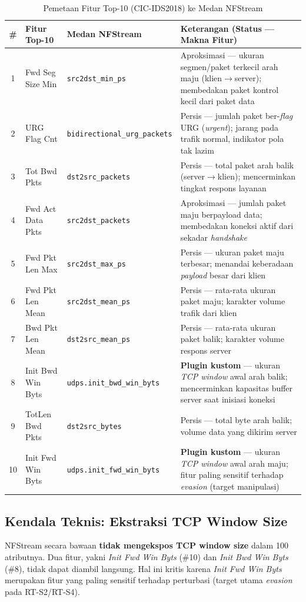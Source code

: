 \documentclass[11pt, a4paper]{article}
\begin{document}
\begin{table}[htbp]
\centering
\caption{Pemetaan Fitur Top-10 (CIC-IDS2018) ke Medan NFStream}
\label{tab:mapping}
\small
\begin{tabularx}{\linewidth}{@{} c l l X @{}}
\toprule
\textbf{\#} & \textbf{Fitur Top-10} & \textbf{Medan NFStream} & \textbf{Keterangan (Status --- Makna Fitur)} \\ \midrule
1 & Fwd Seg Size Min & \texttt{src2dst\_min\_ps} & Aproksimasi --- ukuran segmen/paket terkecil arah maju (klien$\to$server); membedakan paket kontrol kecil dari paket data \\
2 & URG Flag Cnt & \texttt{bidirectional\_urg\_packets} & Persis --- jumlah paket ber-\textit{flag} URG (\textit{urgent}); jarang pada trafik normal, indikator pola tak lazim \\
3 & Tot Bwd Pkts & \texttt{dst2src\_packets} & Persis --- total paket arah balik (server$\to$klien); mencerminkan tingkat respons layanan \\
4 & Fwd Act Data Pkts & \texttt{src2dst\_packets} & Aproksimasi --- jumlah paket maju berpayload data; membedakan koneksi aktif dari sekadar \textit{handshake} \\
5 & Fwd Pkt Len Max & \texttt{src2dst\_max\_ps} & Persis --- ukuran paket maju terbesar; menandai keberadaan \textit{payload} besar dari klien \\
6 & Fwd Pkt Len Mean & \texttt{src2dst\_mean\_ps} & Persis --- rata-rata ukuran paket maju; karakter volume trafik dari klien \\
7 & Bwd Pkt Len Mean & \texttt{dst2src\_mean\_ps} & Persis --- rata-rata ukuran paket balik; karakter volume respons server \\
8 & Init Bwd Win Byts & \texttt{udps.init\_bwd\_win\_byts} & \textbf{Plugin kustom} --- ukuran \textit{TCP window} awal arah balik; mencerminkan kapasitas buffer server saat inisiasi koneksi \\
9 & TotLen Bwd Pkts & \texttt{dst2src\_bytes} & Persis --- total byte arah balik; volume data yang dikirim server \\
10 & Init Fwd Win Byts & \texttt{udps.init\_fwd\_win\_byts} & \textbf{Plugin kustom} --- ukuran \textit{TCP window} awal arah maju; fitur paling sensitif terhadap \textit{evasion} (target manipulasi) \\ \bottomrule
\end{tabularx}
\end{table}

\subsection{Kendala Teknis: Ekstraksi TCP Window Size}
\label{sec:winplugin}
NFStream secara bawaan \textbf{tidak mengekspos TCP window size} dalam 100 atributnya. Dua fitur, yakni \textit{Init Fwd Win Byts} (\#10) dan \textit{Init Bwd Win Byts} (\#8), tidak dapat diambil langsung. Hal ini kritis karena \textit{Init Fwd Win Byts} merupakan fitur yang paling sensitif terhadap perturbasi (target utama \textit{evasion} pada RT-S2/RT-S4).
\end{document}
